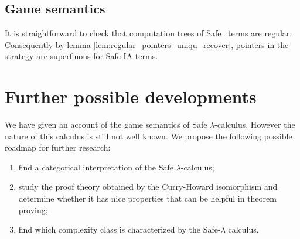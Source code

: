 \subsection{Game semantics}







It is straightforward to check that computation trees of Safe \ialgol\ terms are regular.
Consequently by lemma \ref{lem:regular_pointers_uniqu_recover}, pointers in the strategy are  superfluous for Safe IA terms.




%



\section{Further possible developments}

We have given an account of the game semantics of Safe $\lambda$-calculus. However the nature of this calculus
is still not well known. We propose the following possible roadmap for further research:
\begin{enumerate}
\item find a categorical interpretation of the Safe $\lambda$-calculus;
\item study the proof theory obtained by the Curry-Howard isomorphism and determine whether it has nice properties that can be helpful in theorem proving;
\item find which complexity class is characterized by the Safe-$\lambda$ calculus.
\end{enumerate}

